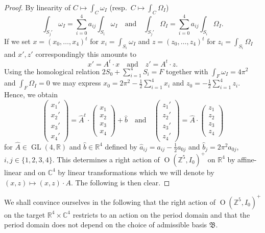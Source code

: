 \documentclass[12pt,letterpaper,reqno]{amsart}
\def\mathbf#1{#1}%
\theoremstyle{remark}
\theoremstyle{definition}
\numberwithin{thm}{section}
\numberwithin{equation}{section}
\numberwithin{figure}{section}
\newcommand{\R}{\ensuremath{\mathbb R}}
\newcommand{\C}{\ensuremath{\mathbb C}}
\newcommand{\Z}{\ensuremath{\mathbb Z}}
\DeclareMathOperator{\GL}{GL}
\DeclareMathOperator{\OO}{O}
\begin{document}
\begin{proof}
By linearity of $C \mapsto \int_C \omega_I$ (resp.\ $C \mapsto \int_C \Omega_I$)
\[
\int_{S_j'} \omega_I  = \sum_{i=0}^4 a_{ij}  \int_{S_i}  \omega_I \quad \text{and} \quad  \int_{S_j'}\Omega_I  = \sum_{i=0}^4 a_{ij}  \int_{S_i}  \Omega_I.
\]
If we set $x= (x_0, \ldots , x_4)^t$ for $x_i =\int_{S_i} \omega_I$ and $z= (z_0, \ldots , z_4)^t$ for $z_i =\int_{S_i} \Omega_I$ and $x',z'$ correspondingly  this amounts to 
\[
x' = A^t \cdot x \quad \text{and} \quad z' = A^t \cdot z.
\]
Using the homological relation $2S_0 + \sum_{i=1}^4 S_i = F$  together with $\int_F \omega_I = 4 \pi^2$ and $\int_F \Omega_I=0$ we may express $x_0= 2 \pi^2 - \frac 12 \sum_{i=1}^4 x_i$ and $z_0 = - \frac 12 \sum_{i=1}^4 z_i$. Hence, we obtain
\[
\begin{pmatrix} 
x_1' \\ x_2' \\ x_3' \\x_4'	
\end{pmatrix}
=
\hat{A}^t \cdot 
\begin{pmatrix} 
x_1 \\ x_2 \\ x_3 \\x_4	
\end{pmatrix}
+ \hat{b}
\quad \text{and} \quad
\begin{pmatrix} 
z_1' \\ z_2' \\ z_3' \\z_4'	
\end{pmatrix}
=
\hat{A} \cdot 
\begin{pmatrix} 
z_1 \\ z_2 \\ z_3 \\z_4	
\end{pmatrix}
\]
for $\hat{A} \in \GL(4,\R)$ and $\hat{b} \in \R^4$ defined by $\hat{a}_{ij} = a_{ij} - \frac 12 a_{0j}$  and $\hat{b}_j = 2 \pi^2 a_{0j}$, $i,j \in \{1, 2, 3, 4\}$. This determines a right action of $\OO(\Z^5,I_0)^+$ on $\R^4$ by affine-linear and on $\C^4$ by linear transformations which we will denote by $(\mathbf x, \mathbf z) \mapsto (\mathbf x, \mathbf z) \cdot A$. The following is then clear.
\end{proof}

We shall convince ourselves in the following that the right action of $\OO(\Z^5,I_0)^+ $ on the target $\R^4 \times \C^4$ restricts to an action on the period domain and that the period domain does not depend on the choice of admissible basis $\mathfrak{B}$.
\end{document}
